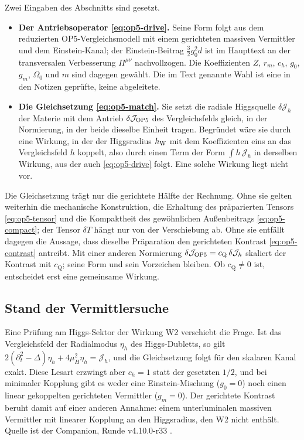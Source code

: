 Zwei Eingaben des Abschnitts sind gesetzt.
\begin{itemize}
 \item \textbf{Der Antriebsoperator \eqref{eq:op5-drive}.} Seine Form folgt aus dem reduzierten OP5-Vergleichsmodell mit einem
 gerichteten massiven Vermittler und dem Einstein-Kanal; der Einstein-Beitrag \(\tfrac32 g_0^2 d\) ist im Haupttext an der
 transversalen Verbesserung \(\Pi^{\mu\nu}\) nachvollzogen. Die Koeffizienten \(Z\), \(r_m\), \(c_h\), \(g_0\), \(g_m\), \(\Omega_0\) und \(m\) sind
 dagegen gewählt. Die im Text genannte Wahl ist eine in den Notizen geprüfte, keine abgeleitete.
 \item \textbf{Die Gleichsetzung \eqref{eq:op5-match}.} Sie setzt die radiale Higgsquelle \(\delta\mathcal J_h\) der Materie mit dem
 Antrieb \(\delta\mathcal J_{\rm OP5}\) des Vergleichsfelds gleich, in der Normierung, in der beide dieselbe Einheit tragen. Begründet wäre sie
 durch eine Wirkung, in der der Higgsradius \(h_{\rm W}\) mit dem Koeffizienten eins an das Vergleichsfeld \(h\) koppelt, also durch einen
 Term der Form \(\int h\,\mathcal J_h\) in derselben Wirkung, aus der auch \eqref{eq:op5-drive} folgt. Eine solche Wirkung liegt nicht vor.
\end{itemize}
Die Gleichsetzung trägt nur die gerichtete Hälfte der Rechnung. Ohne sie gelten weiterhin die mechanische Konstruktion, die Erhaltung
des präparierten Tensors \eqref{eq:op5-tensor} und die Kompaktheit des gewöhnlichen Außenbeitrags \eqref{eq:op5-compact}; der Tensor
\(\delta T\) hängt nur von der Verschiebung ab. Ohne sie entfällt dagegen die Aussage, dass dieselbe Präparation den gerichteten Kontrast
\eqref{eq:op5-contrast} antreibt. Mit einer anderen Normierung \(\delta\mathcal J_{\rm OP5}=c_{\mathrm Q}\,\delta\mathcal J_h\) skaliert der Kontrast mit \(c_{\mathrm Q}\);
seine Form und sein Vorzeichen bleiben. Ob \(c_{\mathrm Q}\neq0\) ist, entscheidet erst eine gemeinsame Wirkung.

\subsection{Stand der Vermittlersuche}
\label{sec:anhang-b-vermittler}

Eine Prüfung am Higgs-Sektor der Wirkung W2 verschiebt die Frage. Ist das Vergleichsfeld der Radialmodus \(\eta_h\) des Higgs-Dubletts, so gilt
\(2(\partial_t^2-\Delta)\eta_h+4\mu_H^2\eta_h=\mathcal J_h\), und die Gleichsetzung folgt für den skalaren Kanal exakt. Diese Lesart erzwingt aber
\(c_h=1\) statt der gesetzten \(1/2\), und bei minimaler Kopplung gibt es weder eine Einstein-Mischung (\(g_0=0\)) noch einen linear
gekoppelten gerichteten Vermittler (\(g_m=0\)). Der gerichtete Kontrast beruht damit auf einer anderen Annahme: einem unterluminalen
massiven Vermittler mit linearer Kopplung an den Higgsradius, den W2 nicht enthält. Quelle ist der Companion, Runde v4.10.0-r33
\cite{layers,repo}.


